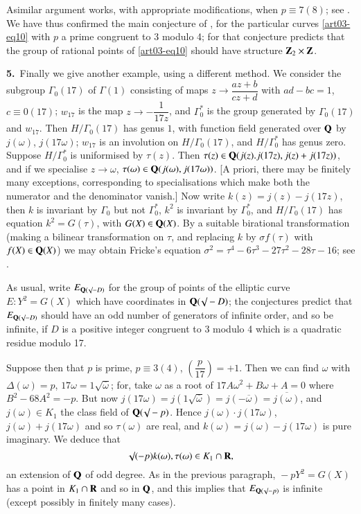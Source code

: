 A\pageoriginale similar argument works, with appropriate modifications, when $p\equiv 7(8)$; see \cite{art03-key5}. We have thus confirmed the main conjecture of \cite{art03-key2}, for the particular curves \eqref{art03-eq10} with $p$ a prime congruent to 3 modulo 4; for that conjecture predicts that the group of rational points of \eqref{art03-eq10} should have structure $\mathbf{Z}_{2}\times \mathbf{Z}$.

\medskip
\noindent
{\bf 5.}~Finally we give another example, using a different method. We consider the subgroup $\Gamma_{0}(17)$ of $\Gamma(1)$ consisting of maps $z\to \dfrac{az+b}{cz+d}$ with $ad-bc=1$, $c\equiv 0(17)$; $w_{17}$ is the map $z\to -\dfrac{1}{17z}$, and $\Gamma^{*}_{0}$ is the group generated by $\Gamma_{0}(17)$ and $w_{17}$. Then $H/\Gamma_{0}(17)$ has genus $1$, with function field generated over $\mathbf{Q}$ by $j(\omega)$, $j(17\omega)$; $w_{17}$ is an involution on $H/\Gamma_{0}(17)$, and $H/\Gamma^{*}_{0}$ has genus zero. Suppose $H/\Gamma^{*}_{0}$ is uniformised by $\tau(z)$. Then $\tau(z)\in \mathbf{Q}(j(z).j(17z),j(z)+j(17z))$, and if we specialise $z\to \omega$, $\tau(\omega)\in \mathbf{Q}(j(\omega),j(17\omega))$. [A priori, there may be finitely many exceptions, corresponding to specialisations which make both the numerator and the denominator vanish.] Now write $k(z)=j(z)-j(17z)$, then $k$ is invariant by $\Gamma_{0}$ but not $\Gamma^{*}_{0}$, $k^{2}$ is invariant by $\Gamma^{*}_{0}$, and $H/\Gamma_{0}(17)$ has equation $k^{2}=G(\tau)$, with $G(X)\in \mathbf{Q}(X)$. By a suitable birational transformation (making a bilinear transformation on $\tau$, and replacing $k$ by $\sigma f(\tau)$ with $f(X)\in \mathbf{Q}(X)$) we may obtain Fricke's equation $\sigma^{2}=\tau^{4}-6\tau^{3}-27\tau^{2}-28\tau-16$; see \cite{art03-key4}.

As usual, write $E_{\mathbf{Q}(\surd -D)}$ for the group of points of the elliptic curve $E:Y^{2}=G(X)$ which have coordinates in $\mathbf{Q}(\surd-D)$; the conjectures predict that $E_{\mathbf{Q}(\surd-D)}$ should have an odd number of generators of infinite order, and so be infinite, if $D$ is a positive integer congruent to 3 modulo 4 which is a quadratic residue modulo 17.

Suppose then that $p$ is prime, $p\equiv 3(4)$, $\left(\dfrac{p}{17}\right)=+1$. Then we can find $\omega$ with $\Delta(\omega)=p$, $17\omega=1\surd\overline{\omega}$; for, take $\omega$ as a root of $17A\omega^{2}+B\omega+A=0$ where $B^{2}-68A^{2}=-p$. But now $j(17\omega)=j(1\surd\overline{\omega})=j(-\overline{\omega})=\overline{j(\omega)}$, and $j(\omega)\in K_{1}$ the class field of $\mathbf{Q}(\surd-p)$. Hence $j(\omega)\cdot j(17\omega)$, $j(\omega)+j(17\omega)$ and so $\tau(\omega)$ are real, and $k(\omega)=j(\omega)-j(17\omega)$ is pure imaginary. We deduce that
$$
\surd (-p)k(\omega),\tau(\omega)\in K_{1}\cap \mathbf{R},
$$\pageoriginale
an extension of $\mathbf{Q}$ of odd degree. As in the previous paragraph, ${}-pY^{2}=G(X)$ has a point in $K_{1}\cap \mathbf{R}$ and so in $\mathbf{Q}$, and this implies that $E_{\mathbf{Q}(\surd-p)}$ is infinite (except possibly in finitely many cases).

